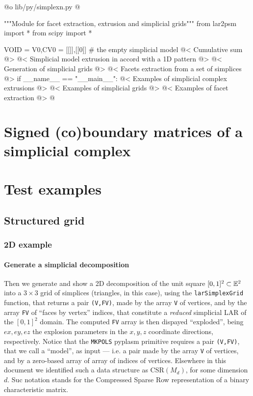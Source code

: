 \documentclass[11pt,oneside]{article}	%
\begin{document}
@o lib/py/simplexn.py 
@{"""Module for facet extraction, extrusion and simplicial grids"""
from lar2psm import *
from scipy import *

VOID = V0,CV0 = [[]],[[0]]    # the empty simplicial model
@< Cumulative sum  @>
@< Simplicial model extrusion in accord with a 1D pattern @>
@< Generation of simplicial grids @>
@< Facets extraction from a set of simplices @>
if __name__ == "__main__":
	@< Examples of simplicial complex extrusions @>
	@< Examples of simplicial grids @>
	@< Examples of facet extraction @>
@}


\section{Signed (co)boundary matrices of a simplicial complex}
\label{simplicial}

\section{Test examples}

\subsection{Structured grid}

\subsubsection{2D example}

\paragraph{Generate a simplicial decomposition}
Then we generate and show a 2D decomposition of the unit square $[0,1]^2\subset\mathbb{E}^2$ into a $3\times 3$ grid of simplices (triangles, in this case), using the \texttt{larSimplexGrid} function, that returns a pair \texttt{(V,FV)}, made by the array \texttt{V} of vertices, and by the array \texttt{FV} of ``faces by vertex'' indices, that constitute a \emph{reduced} simplicial LAR of the $[0,1]^2$ domain. The computed \texttt{FV} array is then dispayed ``exploded'', being $ex,ey,ez$ the explosion parameters in the $x,y,z$ coordinate directions, respectively. Notice that the \texttt{MKPOLS} pyplasm primitive requires a pair \texttt{(V,FV)}, that we call a ``model'', as input --- i.e. a pair made by the array \texttt{V} of vertices, and by a zero-based array of array of indices of vertices. Elsewhere in this document we identified such a data structure as CSR$(M_d)$, for some dimension $d$. Suc notation stands for the Compressed Sparse Row representation of a binary characteristic matrix.
\end{document}
